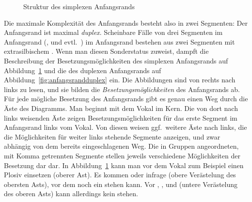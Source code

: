 \begin{figure}[!htbp]
  \centering
  \caption{Struktur des simplexen Anfangsrands}
  \label{fig:anfangsrandsimplex}
\end{figure}

Die maximale Komplexität des Anfangsrands besteht also in zwei Segmenten:
Der Anfangsrand ist maximal \textit{duplex}.
Scheinbare Fälle von drei Segmenten im Anfangsrand (\textipa{[SpK]}, \textipa{[StK]} und evtl.\ \textipa{[Spl]}) im Anfangsrand bestehen aus zwei Segmenten mit extrasilbischem \textipa{[S]}.
Wenn man \textipa{[S]} diesen Sonderstatus zuweist, dampft die Beschreibung der Besetzungsmöglichkeiten des simplexen Anfangsrands auf Abbildung~\ref{fig:anfangsrandsimplex} und die des duplexen Anfangsrands auf Abbildung~\ref{fig:anfangsrandduplex} ein.
Die Abbildungen sind von rechts nach links zu lesen, und sie bilden die \textit{Besetzungsmöglichkeiten} des Anfangsrands ab.
Für jede mögliche Besetzung des Anfangsrands gibt es genau einen Weg durch die Äste des Diagramms.
Man beginnt mit dem Vokal im Kern.
Die von dort nach links weisenden Äste zeigen Besetzungsmöglichkeiten für das erste Segment im Anfangsrand links vom Vokal.
Von diesen weisen ggf.\ weitere Äste nach links, die die Möglichkeiten für weiter links stehende Segmente anzeigen, und zwar abhängig von dem bereits eingeschlagenen Weg.
Die in Gruppen angeordneten, mit Komma getrennten Segmente stellen jeweils verschiedene Möglichkeiten der Besetzung dar dar.
In Abbildung~\ref{fig:anfangsrandsimplex} kann man vor dem Vokal zum Beispiel einen Plosiv einsetzen (oberer Ast).
Es kommen \textipa{[p]} oder \textipa{[t]} infrage (obere Verästelung des obersten Asts), vor dem noch ein \textipa{[S]} stehen kann.
Vor \textipa{[b]}, \textipa{[d]}, \textipa{[k]} und \textipa{[g]} (untere Verästelung des oberen Asts) kann allerdings kein \textipa{[S]} stehen.

